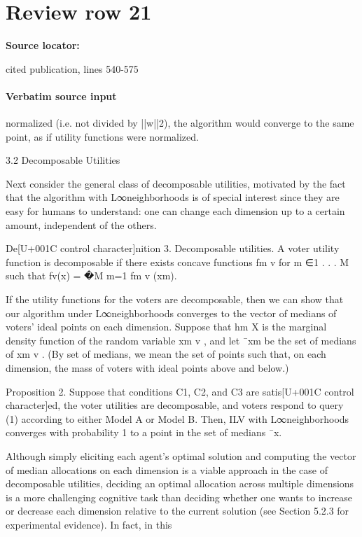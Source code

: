 \documentclass[10pt]{article}
\begin{document}
\section*{Review row 21}
\textbf{Source locator:} {\footnotesize\raggedright cited publication, lines 540-\allowbreak{}575\par}
\paragraph{Verbatim source input}
\begin{ReviewVerbatim}
normalized (i.e. not divided by ||w||2), the algorithm would converge to the same point, as
if utility functions were normalized.

3.2 Decomposable Utilities

Next consider the general class of decomposable utilities, motivated by the fact that the
algorithm with L∞neighborhoods is of special interest since they are easy for humans to
understand: one can change each dimension up to a certain amount, independent of the
others.

De[U+001C control character]nition 3. Decomposable utilities. A voter utility function is decomposable if there
exists concave functions fm
v
for m ∈{1 . . . M} such that fv(x) = �M
m=1 fm
v (xm).

If the utility functions for the voters are decomposable, then we can show that our
algorithm under L∞neighborhoods converges to the vector of medians of voters' ideal points
on each dimension. Suppose that hm
X is the marginal density function of the random variable
xm
v , and let ¯xm be the set of medians of xm
v . (By set of medians, we mean the set of points
such that, on each dimension, the mass of voters with ideal points above and below.)

Proposition 2. Suppose that conditions C1, C2, and C3 are satis[U+001C control character]ed, the voter utilities
are decomposable, and voters respond to query (1) according to either Model A or Model
B. Then, ILV with L∞neighborhoods converges with probability 1 to a point in the set of
medians ¯x.

Although simply eliciting each agent's optimal solution and computing the vector of
median allocations on each dimension is a viable approach in the case of decomposable
utilities, deciding an optimal allocation across multiple dimensions is a more challenging
cognitive task than deciding whether one wants to increase or decrease each dimension
relative to the current solution (see Section 5.2.3 for experimental evidence). In fact, in this
\end{ReviewVerbatim}
\end{document}
